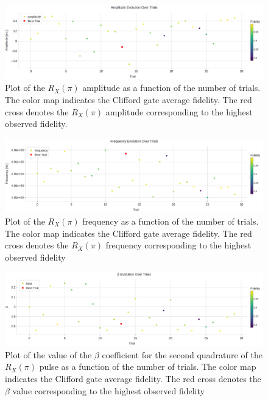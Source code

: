 \begin{figure}[h!]
    \centering
    \includegraphics[width=\textwidth]{figures/png/RB_optimization/Optuna/30/amplitude.png}
    \caption{Plot of the $R_X(\pi)$ amplitude as a function of the number of trials.
    The color map indicates the Clifford gate average fidelity.
    The red cross denotes the $R_X(\pi)$ amplitude corresponding to the highest observed fidelity.}
    \label{fig:optuna30:amplitude}
\end{figure}

\begin{figure}[h!]
    \centering
    \includegraphics[width=\textwidth]{figures/png/RB_optimization/Optuna/30/frequency.png}
    \caption{Plot of the $R_X(\pi)$ frequency as a function of the number of trials. 
    The color map indicates the Clifford gate average fidelity.  
    The red cross denotes the $R_X(\pi)$ frequency corresponding to the highest observed fidelity}
    \label{fig:optuna30:frequency}
\end{figure}

\begin{figure}[h!]
    \centering
    \includegraphics[width=\textwidth]{figures/png/RB_optimization/Optuna/30/beta.png}
    \caption{Plot of the value of the $\beta$ coefficient for the second quadrature of the $R_X(\pi)$ pulse as a function of the number of trials. 
    The color map indicates the Clifford gate average fidelity.  
    The red cross denotes the $\beta$ value corresponding to the highest observed fidelity}
    \label{fig:optuna30:beta}
\end{figure}

